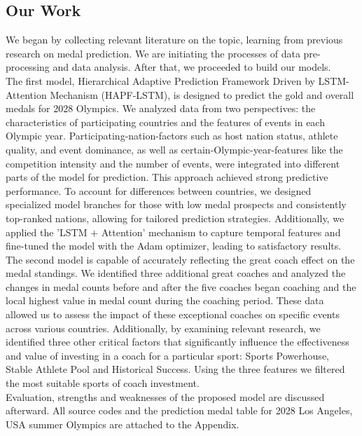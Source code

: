 \documentclass[12pt]{article}
\begin{document}
\subsection{Our Work}
\quad \quad We began by collecting relevant literature on the topic, learning from previous research on medal prediction. We are initiating the processes of data pre-processing and data analysis. After that, we proceeded to build our models.\\ 

The first model, Hierarchical Adaptive Prediction Framework Driven by LSTM-Attention Mechanism (HAPF-LSTM), is designed to predict the gold and overall medals for 2028 Olympics. We analyzed data from two perspectives: the characteristics of participating countries and the features of events in each Olympic year. Participating-nation-factors such as host nation status, athlete quality, and event dominance, as well as certain-Olympic-year-features like the competition intensity and the number of events, were integrated into different parts of the model for prediction. This approach achieved strong predictive performance. To account for differences between countries, we designed specialized model branches for those with low medal prospects and consistently top-ranked nations, allowing for tailored prediction strategies. Additionally, we applied the 'LSTM $+$ Attention' mechanism to capture temporal features and fine-tuned the model with the Adam optimizer, leading to satisfactory results.\\

The second model is capable of accurately reflecting the great coach effect on the medal standings. We identified three additional great coaches and analyzed the changes in medal counts before and after the five coaches began coaching and the local highest value in medal count during the coaching period. These data allowed us to assess the impact of these exceptional coaches on specific events across various countries. Additionally, by examining relevant research, we identified three other critical factors that significantly influence the effectiveness and value of investing in a coach for a particular sport: Sports Powerhouse, Stable Athlete Pool and Historical Success. Using the three features we filtered the most suitable sports of coach investment.\\

 Evaluation, strengths and weaknesses of the proposed model are discussed afterward. All source codes and the prediction medal table for 2028 Los Angeles, USA summer Olympics are attached to the Appendix. 
\end{document}

